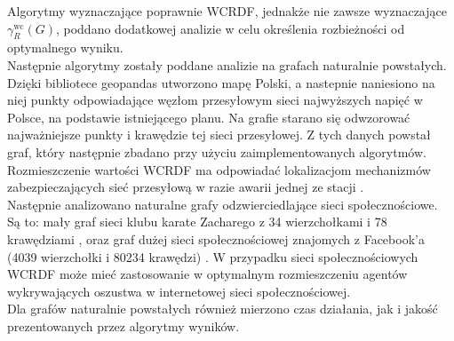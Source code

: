 Algorytmy wyznaczające poprawnie WCRDF, jednakże nie zawsze wyznaczające $\gamma_{R}^{\text{wc}}(G)$, poddano dodatkowej analizie w celu określenia rozbieżności od optymalnego wyniku.\\

Następnie algorytmy zostały poddane analizie na grafach naturalnie powstałych.
Dzięki bibliotece geopandas utworzono mapę Polski, a nastepnie naniesiono na niej punkty odpowiadające węzłom przesyłowym sieci najwyższych napięć w Polsce, na podstawie istniejącego planu. Na grafie starano się odwzorować najważniejsze punkty i krawędzie tej sieci przesyłowej. Z tych danych powstał graf, który następnie zbadano przy użyciu zaimplementowanych algorytmów. Rozmieszczenie wartości WCRDF ma odpowiadać lokalizacjom mechanizmów zabezpieczających sieć przesyłową w razie awarii jednej ze stacji \cite{POLAND}.\\

Następnie analizowano naturalne grafy odzwierciedlające sieci społecznościowe. Są to: mały graf sieci klubu karate Zacharego z 34 wierzchołkami i 78 krawędziami \cite{KARATE}, oraz graf dużej sieci społecznościowej znajomych z Facebook'a (4039 wierzchołki i 80234 krawędzi) \cite{FACEBOOK}. W przypadku sieci społecznościowych WCRDF może mieć zastosowanie w optymalnym rozmieszczeniu agentów wykrywających oszustwa w internetowej sieci społecznościowej.\\

Dla grafów naturalnie powstałych również mierzono czas działania, jak i jakość prezentowanych przez algorytmy wyników.



